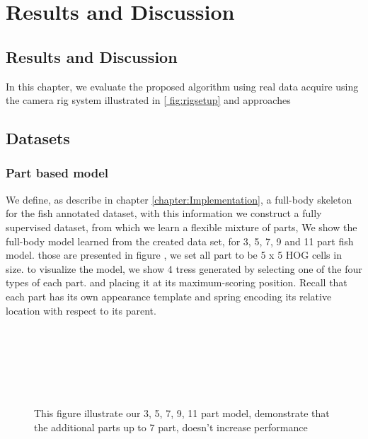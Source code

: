 \chapter{Results and Discussion}
\label{chapter:Results and Discussion}

\section{Results and Discussion}
In this chapter, we evaluate the proposed algorithm using real data acquire using 
the camera rig system illustrated in \ref{ fig:rigsetup} and 
approaches 

\section{Datasets}

\subsection{Part based model}
We define, as describe in chapter \ref{chapter:Implementation}, a full-body skeleton 
for the fish annotated dataset, with this information we construct a fully supervised 
dataset, from which we learn a flexible mixture of parts, We show the full-body model learned
from the created data set, for 3, 5, 7, 9 and 11 part fish model. those are presented in 
figure , we set all part to be 5 x 5 HOG cells in size. to visualize
the model, we show 4 tress generated by selecting one of the four types of each part. and placing 
it at its maximum-scoring position. Recall that each part has its own appearance template and
spring encoding its relative location with respect to its parent.


\begin{figure}
\begin{adjustwidth}{-1in}{-1in} 
\label{fig:moodelhog}
\centering     %
{}\\
 \\
 \\
\\
\\
\caption{This figure illustrate our 3, 5, 7, 9, 11 part model, demonstrate
that the additional parts up to 7 part, doesn't increase performance}
\end{adjustwidth}
\end{figure}
